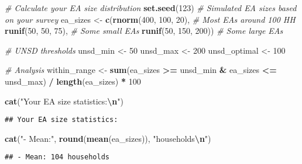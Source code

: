 \documentclass[
]{article}
\newenvironment{Shaded}{\begin{snugshade}}{\end{snugshade}}
\newcommand{\CommentTok}[1]{\textcolor[rgb]{0.56,0.35,0.01}{\textit{#1}}}
\newcommand{\DecValTok}[1]{\textcolor[rgb]{0.00,0.00,0.81}{#1}}
\newcommand{\FunctionTok}[1]{\textcolor[rgb]{0.13,0.29,0.53}{\textbf{#1}}}
\newcommand{\NormalTok}[1]{#1}
\newcommand{\OtherTok}[1]{\textcolor[rgb]{0.56,0.35,0.01}{#1}}
\newcommand{\SpecialCharTok}[1]{\textcolor[rgb]{0.81,0.36,0.00}{\textbf{#1}}}
\newcommand{\StringTok}[1]{\textcolor[rgb]{0.31,0.60,0.02}{#1}}
\begin{document}
\begin{Shaded}
\begin{Highlighting}[]
\CommentTok{\# Calculate your EA size distribution}
\FunctionTok{set.seed}\NormalTok{(}\DecValTok{123}\NormalTok{)}
\CommentTok{\# Simulated EA sizes based on your survey}
\NormalTok{ea\_sizes }\OtherTok{\textless{}{-}} \FunctionTok{c}\NormalTok{(}\FunctionTok{rnorm}\NormalTok{(}\DecValTok{400}\NormalTok{, }\DecValTok{100}\NormalTok{, }\DecValTok{20}\NormalTok{),   }\CommentTok{\# Most EAs around 100 HH}
             \FunctionTok{runif}\NormalTok{(}\DecValTok{50}\NormalTok{, }\DecValTok{50}\NormalTok{, }\DecValTok{75}\NormalTok{),       }\CommentTok{\# Some small EAs}
             \FunctionTok{runif}\NormalTok{(}\DecValTok{50}\NormalTok{, }\DecValTok{150}\NormalTok{, }\DecValTok{200}\NormalTok{))     }\CommentTok{\# Some large EAs}

\CommentTok{\# UNSD thresholds}
\NormalTok{unsd\_min }\OtherTok{\textless{}{-}} \DecValTok{50}
\NormalTok{unsd\_max }\OtherTok{\textless{}{-}} \DecValTok{200}
\NormalTok{unsd\_optimal }\OtherTok{\textless{}{-}} \DecValTok{100}

\CommentTok{\# Analysis}
\NormalTok{within\_range }\OtherTok{\textless{}{-}} \FunctionTok{sum}\NormalTok{(ea\_sizes }\SpecialCharTok{\textgreater{}=}\NormalTok{ unsd\_min }\SpecialCharTok{\&}\NormalTok{ ea\_sizes }\SpecialCharTok{\textless{}=}\NormalTok{ unsd\_max) }\SpecialCharTok{/} 
                \FunctionTok{length}\NormalTok{(ea\_sizes) }\SpecialCharTok{*} \DecValTok{100}

\FunctionTok{cat}\NormalTok{(}\StringTok{"Your EA size statistics:}\SpecialCharTok{\textbackslash{}n}\StringTok{"}\NormalTok{)}
\end{Highlighting}
\end{Shaded}

\begin{verbatim}
## Your EA size statistics:
\end{verbatim}

\begin{Shaded}
\begin{Highlighting}[]
\FunctionTok{cat}\NormalTok{(}\StringTok{"{-} Mean:"}\NormalTok{, }\FunctionTok{round}\NormalTok{(}\FunctionTok{mean}\NormalTok{(ea\_sizes)), }\StringTok{"households}\SpecialCharTok{\textbackslash{}n}\StringTok{"}\NormalTok{)}
\end{Highlighting}
\end{Shaded}

\begin{verbatim}
## - Mean: 104 households
\end{verbatim}
\end{document}
